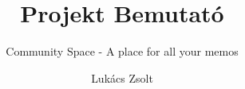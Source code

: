 \documentclass[aspectratio=43,11pt]{beamer}
\title{Projekt Bemutató}
\subtitle{Community Space - A place for all your memos}
\author{Lukács Zsolt}
\begin{document}
\frame{\titlepage}




\end{document}
